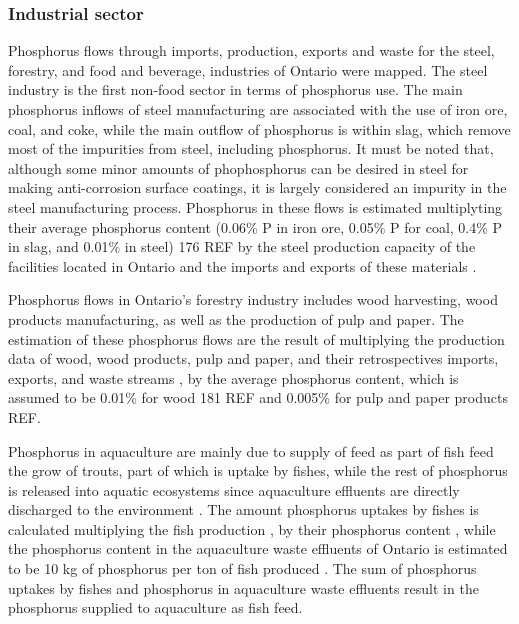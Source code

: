 \documentclass[authoryear]{elsarticle}
\begin{document}
\subsubsection{Industrial sector}
Phosphorus flows through imports, production, exports and waste for the steel, forestry, and food and beverage, industries of Ontario were mapped.
The steel industry is the first non-food sector in terms of phosphorus use. The main phosphorus inflows of steel manufacturing are associated with the use of iron ore, coal, and coke, while the main outflow of phosphorus is within slag, which remove most of the impurities from steel, including phosphorus. It must be noted that, although some minor amounts of phophosphorus can be desired in steel for making anti-corrosion surface coatings, it is largely considered an impurity in the steel manufacturing process. Phosphorus in these flows is estimated multiplyting their average phosphorus content (0.06\% P in iron ore, 0.05\% P for coal, 0.4\% P in slag, and 0.01\% in steel) 176 REF by the steel production capacity of the facilities located in Ontario \citep{CheminfoServices, AlgomaSteel, Stelco, PFlows_Ontario} and the imports and exports of these materials \citep{WorldIntegratedTradeSolution, InterprovincialImportsExports}.

Phosphorus flows in Ontario's forestry industry includes wood harvesting, wood products manufacturing, as well as the production of pulp and paper. The estimation of these phosphorus flows are the result of multiplying the production data of wood, wood products, pulp and paper, and their retrospectives imports, exports, and waste streams \citep{CanadianForestServiceStatistics, InterprovincialImportsExports}, by the average phosphorus content, which is assumed to be 0.01\% for wood 181 REF and 0.005\% for pulp and paper products REF.

Phosphorus in aquaculture are mainly due to supply of feed as part of fish feed the grow of trouts, part of which is uptake by fishes, while the rest of phosphorus is released into aquatic ecosystems since aquaculture effluents are directly discharged to the environment \citep{OntarioAquaculture}. The amount phosphorus uptakes by fishes
is calculated multiplying the fish production \citep{StatisticsCanadaAquaculture}, by their phosphorus content \citep{CanadianNutrientFile}, while the phosphorus content in the aquaculture waste effluents of Ontario is estimated to be 10 kg of phosphorus per ton of fish produced \citep{bureau2003chemical}. The sum of phosphorus uptakes by fishes and phosphorus in aquaculture waste effluents result in the phosphorus supplied to aquaculture as fish feed.
\end{document}
